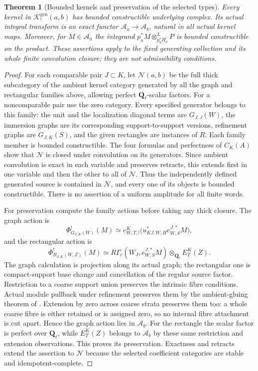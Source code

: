 \documentclass[11pt]{article}
\newtheorem{theorem}[proposition]{Theorem}
\theoremstyle{definition}
\theoremstyle{remark}
\newcommand{\Q}{\mathbf Q_\ell}
\begin{document}
\begin{theorem}[Bounded kernels and preservation of the selected types]
\label{thm:kernel-preservation}
Every kernel in $\mathscr K_!^{\mathrm{gen}}(a,b)$ has bounded
constructible underlying complex.  Its actual integral transform is
an exact functor $\mathcal A_a\to\mathcal A_b$, natural in all actual
kernel maps.  Moreover, for $M\in\mathcal A_a$ the integrand
$p_a^*M\otimes_{p_a^*H_a}^LP$ is bounded constructible on the product.
These assertions apply to the fixed generating collection and its
whole finite convolution closure; they are not admissibility conditions.
\end{theorem}
\begin{proof}
For each comparable pair $J\subset K$, let $\mathcal N(a,b)$ be the
full thick subcategory of the ambient kernel category generated by
all the graph and rectangular families above, allowing perfect
$\Q$-scalar factors.  For a noncomparable pair use the zero category.
Every specified generator belongs to this family: the unit and the
localization diagonal terms are $G_{J,J}(W)$, the immersion graphs
are its corresponding support-to-support versions, refinement graphs
are $G_{J,K}(S)$, and the given rectangles are instances of $R$.
Each family member is bounded constructible.  The four formulas and
perfectness of $C_K(A)$ show that $\mathcal N$ is closed under
convolution on its generators.  Since ambient convolution is exact
in each variable and preserves retracts, this extends first in one
variable and then the other to all of $\mathcal N$.
Thus the independently defined generated source is contained in
$\mathcal N$, and every one of its objects is bounded constructible.
There is no assertion of a uniform amplitude for all finite words.

For preservation compute the family actions before taking any thick
closure.  The graph action is
\[
 \Phi^!_{G_{J,K}(W)}(M)
  \simeq e^K_{W,T,!}\bigl(u_{KJ,W,H}^*e^{J,*}_{W,S}M\bigr),
\]
and the rectangular action is
\[
 \Phi^!_{R_{J,K}(W,Z)}(M)
  \simeq R\Gamma_c(W_J,e^{J,*}_{W,S}M)
                      \otimes_{\Q}E^K_T(Z).
\]
The graph calculation is projection along its actual graph;
the rectangular one is compact-support base change and cancellation
of the regular source factor.  Restriction to a coarse support union
preserves the intrinsic fibre conditions.  Actual module pullback
under refinement preserves them by the ambient-gluing theorem of
\cite{Refinement}.  Extension by zero across coarse strata preserves
them too: a whole coarse fibre is either retained or is assigned zero,
so no internal fibre attachment is cut apart.  Hence the graph action
lies in $\mathcal A_b$.  For the rectangle the scalar factor is
perfect over $\Q$, while $E^K_T(Z)$ belongs to $\mathcal A_b$ by
these same restriction and extension observations.  This proves its
preservation.  Exactness and retracts extend the assertion to
$\mathcal N$ because the selected coefficient categories are stable
and idempotent-complete.


\end{proof}
\end{document}
